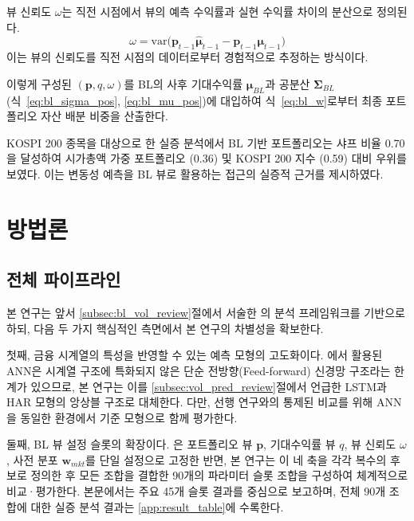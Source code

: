 \documentclass[eng]{kjas3}
\begin{document}
뷰 신뢰도 $\omega$는 직전 시점에서 뷰의 예측 수익률과 실현 수익률 차이의 분산으로 정의된다.
\begin{equation}
\omega = \mathrm{var}\bigl(\mathbf{p}_{t-1} \hat{\boldsymbol{\mu}}_{t-1}
       - \mathbf{p}_{t-1} \boldsymbol{\mu}_{t-1}\bigr)
\label{eq:pyo_omega}
\end{equation}
이는 뷰의 신뢰도를 직전 시점의 데이터로부터 경험적으로 추정하는 방식이다.

이렇게 구성된 $(\mathbf{p}, q, \omega)$를 BL의 사후 기대수익률 $\boldsymbol{\mu}_{BL}$과 공분산 $\boldsymbol{\Sigma}_{BL}$ (식~\eqref{eq:bl_sigma_pos}, \eqref{eq:bl_mu_pos})에 대입하여 식~\eqref{eq:bl_w}로부터 최종 포트폴리오 자산 배분 비중을 산출한다.

KOSPI 200 종목을 대상으로 한 실증 분석에서 BL 기반 포트폴리오는 샤프 비율 0.70을 달성하여 시가총액 가중 포트폴리오 (0.36) 및 KOSPI 200 지수 (0.59) 대비 우위를 보였다. 이는 변동성 예측을 BL 뷰로 활용하는 접근의 실증적 근거를 제시하였다.

\section{방법론}\label{sec:method}

\subsection{전체 파이프라인}\label{subsec:pipeline}

본 연구는 앞서 \ref{subsec:bl_vol_review}절에서 서술한 \citet{pyo2018}의 분석 프레임워크를 기반으로 하되, 다음 두 가지 핵심적인 측면에서 본 연구의 차별성을 확보한다.

첫째, 금융 시계열의 특성을 반영할 수 있는 예측 모형의 고도화이다. \citet{pyo2018}에서 활용된 ANN은 시계열 구조에 특화되지 않은 단순 전방향(Feed-forward) 신경망 구조라는 한계가 있으므로, 본 연구는 이를 \ref{subsec:vol_pred_review}절에서 언급한 LSTM과 HAR 모형의 앙상블 구조로 대체한다. 다만, 선행 연구와의 통제된 비교를 위해 ANN을 동일한 환경에서 기준 모형으로 함께 평가한다.

둘째, BL 뷰 설정 슬롯의 확장이다. \citet{pyo2018}은 포트폴리오 뷰 $\mathbf{p}$, 기대수익률 뷰 $q$, 뷰 신뢰도 $\omega$, 사전 분포 $\mathbf{w}_{mkt}$를 단일 설정으로 고정한 반면, 본 연구는 이 네 축을 각각 복수의 후보로 정의한 후 모든 조합을 결합한 90개의 파라미터 슬롯 조합을 구성하여 체계적으로 비교·평가한다. 본문에서는 주요 45개 슬롯 결과를 중심으로 보고하며, 전체 90개 조합에 대한 실증 분석 결과는 \ref{app:result_table}에 수록한다.
\end{document}
